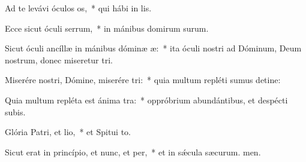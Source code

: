 \item Ad te levávi óculos os,~* qui hábi in lis.
\item Ecce sicut óculi serrum,~* in mánibus domirum surum.
\item Sicut óculi ancíllæ in mánibus dóminæ æ:~* ita óculi nostri ad Dóminum, Deum nostrum, donec miseretur tri.
\item Miserére nostri, Dómine, miserére tri:~* quia multum repléti sumus detine:
\item Quia multum repléta est ánima tra:~* oppróbrium abundántibus, et despécti subis.
\item Glória Patri, et lio,~* et Spitui to.
\item Sicut erat in princípio, et nunc, et per,~* et in sǽcula sæcurum. men.
